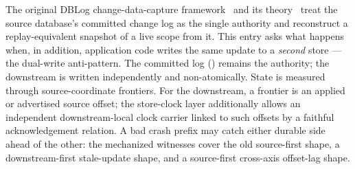 \documentclass[11pt,a4paper]{article}
\begin{document}
The original DBLog change-data-capture framework~\cite{andreakis2020dblog}
and its theory~\cite{andreakis2026theoretical} treat the source database's
committed change log as the single authority and reconstruct a
replay-equivalent snapshot of a live scope from it. This entry asks what
happens when, in addition, application code writes the same update to a
\emph{second} store --- the dual-write anti-pattern. The committed log
() remains the authority; the downstream
 is written independently and non-atomically. State
is measured through source-coordinate frontiers. For the downstream, a frontier
is an applied or advertised source offset; the store-clock layer additionally
allows an independent downstream-local clock carrier linked to such offsets by a
faithful acknowledgement relation. A bad crash prefix may catch either durable
side ahead of the other: the mechanized witnesses cover the old source-first
shape, a downstream-first stale-update shape, and a source-first cross-axis
offset-lag shape.
\end{document}
